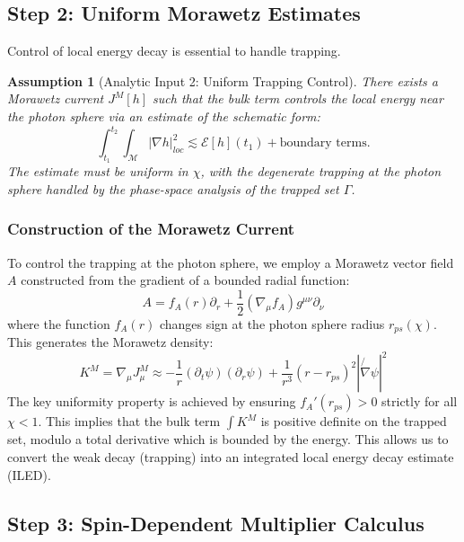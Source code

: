 \documentclass[12pt,a4paper]{article}
\newtheorem{assumption}[theorem]{Assumption}
\newcommand{\slashed}[1]{\not{#1}}
\begin{document}
\subsection{Step 2: Uniform Morawetz Estimates}

Control of local energy decay is essential to handle trapping.

\begin{assumption}[Analytic Input 2: Uniform Trapping Control]\label{ass:trapping}
There exists a Morawetz current $J^M[h]$ such that the bulk term controls the local energy near the photon sphere via an estimate of the schematic form:
\begin{equation}
\int_{t_1}^{t_2} \int_{\mathcal{M}} |\nabla h|^2_{loc} \lesssim \mathcal{E}[h](t_1) + \text{boundary terms}.
\end{equation}
The estimate must be uniform in $\chi$, with the degenerate trapping at the photon sphere handled by the phase-space analysis of the trapped set $\Gamma$.
\end{assumption}

\subsubsection{Construction of the Morawetz Current}

To control the trapping at the photon sphere, we employ a Morawetz vector field $A$ constructed from the gradient of a bounded radial function:
\begin{equation}
A = f_A(r) \partial_r + \frac{1}{2} (\nabla_\mu f_A) g^{\mu\nu} \partial_\nu
\end{equation}
where the function $f_A(r)$ changes sign at the photon sphere radius $r_{ps}(\chi)$.
This generates the Morawetz density:
\begin{equation}
K^M = \nabla_\mu J^M_\mu \approx -\frac{1}{r} (\partial_t \psi)(\partial_r \psi) + \frac{1}{r^3} (r-r_{ps})^2 |\slashed{\nabla} \psi|^2
\end{equation}
The key uniformity property is achieved by ensuring $f_A'(r_{ps}) > 0$ strictly for all $\chi < 1$. This implies that the bulk term $\int K^M$ is positive definite on the trapped set, modulo a total derivative which is bounded by the energy. This allows us to convert the weak decay (trapping) into an integrated local energy decay estimate (ILED).

\subsection{Step 3: Spin-Dependent Multiplier Calculus}
\end{document}

